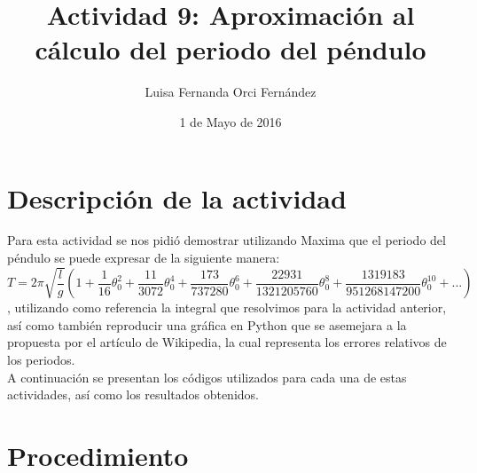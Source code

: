\documentclass[12 pt]{article}
\begin{document}
\title{Actividad 9: Aproximación al cálculo del periodo del péndulo}
\author{Luisa Fernanda Orci Fernández}
\date{1 de Mayo de 2016}
\maketitle
\section*{Descripción de la actividad}
Para esta actividad se nos pidió demostrar utilizando Maxima que el periodo del péndulo se puede expresar de la siguiente manera:
	$$T=2\pi \sqrt{\frac{l}{g}}( 1+\frac{1}{16}\theta_{0}^2+\frac{11}{3072}\theta_{0}^4+\frac{173}{737280}\theta_{0}^6+\frac{22931}{1321205760}\theta_{0}^8+\frac{1319183}{951268147200}\theta_{0}^10+...)$$, utilizando como referencia la integral que resolvimos para la actividad anterior, así como también reproducir una gráfica en Python que se asemejara a la propuesta por el artículo de Wikipedia, la cual representa los errores relativos de los periodos.\\
	A continuación se presentan los códigos utilizados para cada una de estas actividades, así como los resultados obtenidos.
	\section*{Procedimiento}
\end{document}
